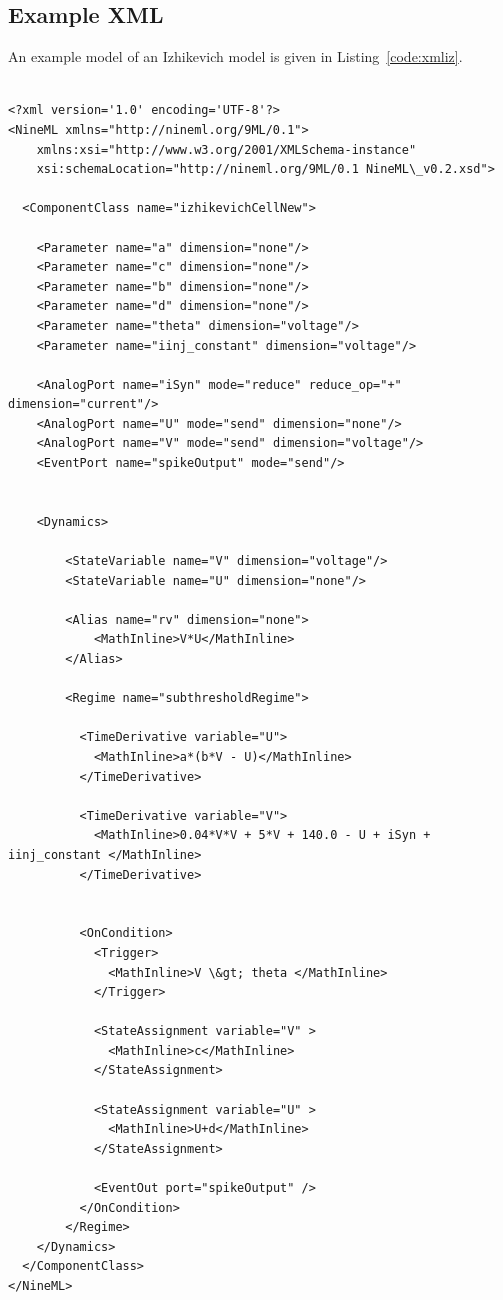 \documentclass{article}
\begin{document}
\pagebreak

\subsection{Example XML}

An example model of an Izhikevich model is given in Listing~\ref{code:xmliz}.

\begin{lstlisting}[caption={Example NineML file of an Izhikevich Neuron},label=xmliz]

<?xml version='1.0' encoding='UTF-8'?>
<NineML xmlns="http://nineml.org/9ML/0.1">
    xmlns:xsi="http://www.w3.org/2001/XMLSchema-instance"
    xsi:schemaLocation="http://nineml.org/9ML/0.1 NineML\_v0.2.xsd">

  <ComponentClass name="izhikevichCellNew">

    <Parameter name="a" dimension="none"/>
    <Parameter name="c" dimension="none"/>
    <Parameter name="b" dimension="none"/>
    <Parameter name="d" dimension="none"/>
    <Parameter name="theta" dimension="voltage"/>
    <Parameter name="iinj_constant" dimension="voltage"/>

    <AnalogPort name="iSyn" mode="reduce" reduce_op="+" dimension="current"/>
    <AnalogPort name="U" mode="send" dimension="none"/>
    <AnalogPort name="V" mode="send" dimension="voltage"/>
    <EventPort name="spikeOutput" mode="send"/>


    <Dynamics>

        <StateVariable name="V" dimension="voltage"/>
        <StateVariable name="U" dimension="none"/>

        <Alias name="rv" dimension="none">
            <MathInline>V*U</MathInline>
        </Alias>

        <Regime name="subthresholdRegime">

          <TimeDerivative variable="U">
            <MathInline>a*(b*V - U)</MathInline>
          </TimeDerivative>

          <TimeDerivative variable="V">
            <MathInline>0.04*V*V + 5*V + 140.0 - U + iSyn + iinj_constant </MathInline>
          </TimeDerivative>


          <OnCondition>
            <Trigger>
              <MathInline>V \&gt; theta </MathInline>
            </Trigger>

            <StateAssignment variable="V" >
              <MathInline>c</MathInline>
            </StateAssignment>

            <StateAssignment variable="U" >
              <MathInline>U+d</MathInline>
            </StateAssignment>

            <EventOut port="spikeOutput" />
          </OnCondition>
        </Regime>
    </Dynamics>
  </ComponentClass>
</NineML>
\end{lstlisting}
\end{document}
